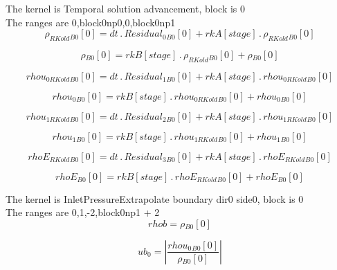 \documentclass{article}
\begin{document}
\noindent The kernel is Temporal solution advancement, block is 0\\\noindent The ranges are 0,block0np0,0,block0np1\\\begin{dmath}{\rho_{RKold}{_{B0}}}[{0}] = dt \,.\, {Residual_{0}{_{B0}}}[{0}] + {rkA}[{stage}] \,.\, {\rho_{RKold}{_{B0}}}[{0}]\end{dmath}

\begin{dmath}{\rho{_{B0}}}[{0}] = {rkB}[{stage}] \,.\, {\rho_{RKold}{_{B0}}}[{0}] + {\rho{_{B0}}}[{0}]\end{dmath}

\begin{dmath}{rhou_{0 RKold}{_{B0}}}[{0}] = dt \,.\, {Residual_{1}{_{B0}}}[{0}] + {rkA}[{stage}] \,.\, {rhou_{0 RKold}{_{B0}}}[{0}]\end{dmath}

\begin{dmath}{rhou_{0}{_{B0}}}[{0}] = {rkB}[{stage}] \,.\, {rhou_{0 RKold}{_{B0}}}[{0}] + {rhou_{0}{_{B0}}}[{0}]\end{dmath}

\begin{dmath}{rhou_{1 RKold}{_{B0}}}[{0}] = dt \,.\, {Residual_{2}{_{B0}}}[{0}] + {rkA}[{stage}] \,.\, {rhou_{1 RKold}{_{B0}}}[{0}]\end{dmath}

\begin{dmath}{rhou_{1}{_{B0}}}[{0}] = {rkB}[{stage}] \,.\, {rhou_{1 RKold}{_{B0}}}[{0}] + {rhou_{1}{_{B0}}}[{0}]\end{dmath}

\begin{dmath}{rhoE_{RKold}{_{B0}}}[{0}] = dt \,.\, {Residual_{3}{_{B0}}}[{0}] + {rkA}[{stage}] \,.\, {rhoE_{RKold}{_{B0}}}[{0}]\end{dmath}

\begin{dmath}{rhoE{_{B0}}}[{0}] = {rkB}[{stage}] \,.\, {rhoE_{RKold}{_{B0}}}[{0}] + {rhoE{_{B0}}}[{0}]\end{dmath}

\noindent The kernel is InletPressureExtrapolate boundary dir0 side0, block is 0\\\noindent The ranges are 0,1,-2,block0np1 + 2\\\begin{dmath}rhob = {\rho{_{B0}}}[{0}]\end{dmath}

\begin{dmath}ub_{0} = \left|{\frac{{rhou_{0}{_{B0}}}[{0}]}{{\rho{_{B0}}}[{0}]}}\right|\end{dmath}
\end{document}
